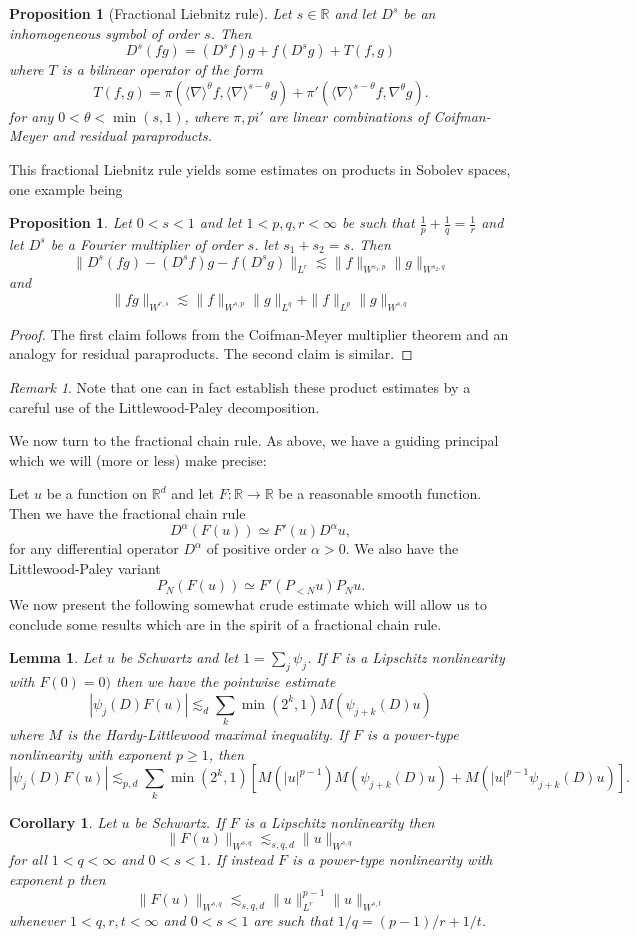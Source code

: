 \documentclass[11pt]{article}
\newtheorem{lem}[thm]{Lemma}
\newtheorem{prop}[thm]{Proposition}
\newtheorem{cor}[thm]{Corollary}
\theoremstyle{remark}
\newtheorem*{rmk}{Remark}
\newcommand{\1}{\textbf{1}}
\newcommand{\lle}{\lesssim}
\def\norm#1{\| #1  \|}
\def\brac#1{\langle #1  \rangle}
\newcommand{\bbR}{\mathbb{R}}
\begin{document}
\begin{prop}[Fractional Liebnitz rule]
Let $s \in \bbR$ and let $D^s$ be an inhomogeneous symbol of order $s$. Then
\[
D^s(fg) = (D^s f)g + f(D^s g) + T(f,g)
\]
where $T$ is a bilinear operator of the form
\[
T(f,g) = \pi(\brac{\nabla}^\theta f, \brac{\nabla}^{s-\theta} g) + \pi'(\brac{\nabla}^{s-\theta} f, \nabla^{\theta} g ).
\]
for any $0 < \theta < \min(s,1)$, where $\pi, pi'$ are linear combinations of Coifman-Meyer and residual paraproducts.
\end{prop}
This fractional Liebnitz rule yields some estimates on products in Sobolev spaces, one example being
\begin{prop}
Let $0 < s<1$ and let $1 < p,q,r < \infty$ be such that $\frac{1}{p} + \frac{1}{q} = \frac{1}{r}$ and let $D^s$ be a Fourier multiplier of order $s$. let $s_1 + s_2 = s$. Then
\[
\norm{D^s(fg) - (D^s f) g - f(D^s g)}_{L^r} \lle \norm{f}_{W^{s_1,p}} \norm{g}_{W^{s_2,q}}
\]
and
\[
\norm{fg}_{W^{r,s}} \lle \norm{f}_{W^{s,p}} \norm{g}_{L^q} + \norm{f}_{L^p} \norm{g}_{W^{s,q}}
\]
\end{prop}
\begin{proof}
The first claim follows from the Coifman-Meyer multiplier theorem and an analogy for residual paraproducts. The second claim is similar.
\end{proof}
\begin{rmk}
Note that one can in fact establish these product estimates by a careful use of the Littlewood-Paley decomposition.
\end{rmk}
We now turn to the fractional chain rule. As above, we have a guiding principal which we will (more or less) make precise:

\vspace{4mm}
Let $u$ be a function on $\bbR^d$ and let $F: \bbR \to \bbR$ be a reasonable smooth function. Then we have the fractional chain rule
\[
D^\alpha(F(u)) \simeq F'(u) D^\alpha u,
\]
for any differential operator $D^\alpha$ of positive order $\alpha >0$. We also have the Littlewood-Paley variant
\[
P_N(F(u)) \simeq F'(P_{<N} u)P_N u.
\]
We now present the following somewhat crude estimate which will allow us to conclude some results which are in the spirit of a fractional chain rule.
\begin{lem}
Let $u$ be Schwartz and let $1 = \sum_j \psi_j$. If $F$ is a Lipschitz nonlinearity with $F(0) = 0)$ then we have the pointwise estimate
\[
|\psi_j(D) F(u)| \lle_d \sum_k \min(2^k,1)M(\psi_{j+k}(D) u)
\]
where $M$ is the Hardy-Littlewood maximal inequality. If $F$ is a power-type nonlinearity with exponent $p \geq 1$, then
\[
|\psi_j(D)F(u)| \lle_{p,d} \sum_k \min(2^k,1)[M(|u|^{p-1}) M( \psi_{j +k}(D) u) + M(|u|^{p-1} \psi_{j+k}(D)u)].
\]
\end{lem}
\begin{cor}
Let $u$ be Schwartz. If $F$ is a Lipschitz nonlinearity then
\[
\norm{F(u)}_{W^{s,q}} \lle_{s,q,d} \norm{u}_{W^{s,q}}
\]
for all $1 < q < \infty$ and $0 < s < 1$. If instead $F$ is a power-type nonlinearity with exponent $p$ then
\[
\norm{F(u)}_{W^{s,q}} \lle_{s,q,d} \norm{u}_{L^r}^{p-1}\norm{u}_{W^{s,t}}
\]
whenever $1 < q,r,t < \infty$ and $0 < s <1$ are such that $1/q = (p-1)/r + 1/t$.
\end{cor}
\end{document}
